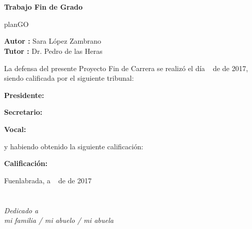 \documentclass[a4paper, 12pt]{book}
\begin{document}
\newpage
\mbox{}
\thispagestyle{empty} %


\clearpage
{}
\chapter*{}

\vspace{-4cm}
\begin{center}
\LARGE
\textbf{Trabajo Fin de Grado}

\vspace{1cm}
\large
planGO

\vspace{1cm}
\large
\textbf{Autor :} Sara L\'opez Zambrano \\
\textbf{Tutor :} Dr. Pedro de las Heras

\end{center}

\vspace{1cm}
La defensa del presente Proyecto Fin de Carrera se realiz\'o el d\'ia \qquad$\;\,$ de \qquad\qquad\qquad\qquad \newline de 2017, siendo calificada por el siguiente tribunal:


\vspace{0.5cm}
\textbf{Presidente:}

\vspace{1.2cm}
\textbf{Secretario:}

\vspace{1.2cm}
\textbf{Vocal:}


\vspace{1.2cm}
y habiendo obtenido la siguiente calificaci\'on:

\vspace{1cm}
\textbf{Calificaci\'on:}


\vspace{1cm}
\begin{flushright}
Fuenlabrada, a \qquad$\;\,$ de \qquad\qquad\qquad\qquad de 2017
\end{flushright}


\chapter*{}
\begin{flushright}
\textit{Dedicado a \\
mi familia / mi abuelo / mi abuela}
\end{flushright}
\end{document}
